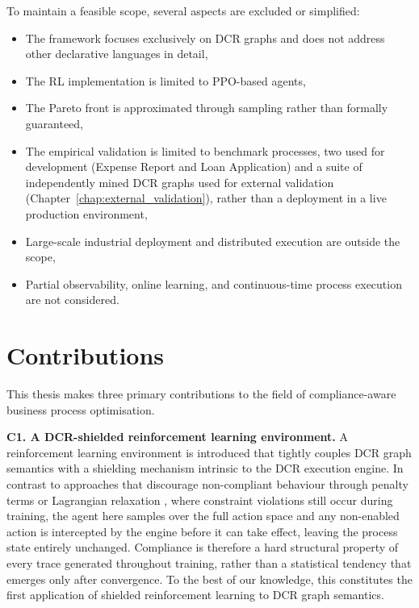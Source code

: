 To maintain a feasible scope, several aspects are excluded or
simplified:
\begin{itemize}
    \item The framework focuses exclusively on \ac{DCR} graphs and does
    not address other declarative languages in detail,
    \item The \ac{RL} implementation is limited to \ac{PPO}-based agents,
    \item The Pareto front is approximated through sampling rather than
    formally guaranteed,
    \item The empirical validation is limited to benchmark processes,
    two used for development (Expense Report and Loan Application) and a
    suite of independently mined \ac{DCR} graphs used for external
    validation (Chapter~\ref{chap:external_validation}), rather than a
    deployment in a live production environment,
    \item Large-scale industrial deployment and distributed execution are
    outside the scope,
    \item Partial observability, online learning, and
    continuous-time process execution are not considered.
\end{itemize}

\section{Contributions}
\label{sec:contributions}

This thesis makes three primary contributions to the field of
compliance-aware business process optimisation.

\textbf{C1.\label{cont:c1} A DCR-shielded reinforcement learning environment.}
A reinforcement learning environment is introduced that tightly couples
\ac{DCR} graph semantics with a shielding mechanism intrinsic to the
\ac{DCR} execution engine.
In contrast to approaches that discourage non-compliant behaviour
through penalty terms or Lagrangian relaxation
\cite{AltmanCONSTRAINEDPROCESSES, Achiam2017ConstrainedOptimization}, where
constraint violations still occur during training, the agent here
samples over the full action space and any non-enabled action is
intercepted by the engine before it can take effect, leaving the
process state entirely unchanged.
Compliance is therefore a hard structural property of every trace
generated throughout training, rather than a statistical tendency that
emerges only after convergence.
To the best of our knowledge, this constitutes the first application of
shielded reinforcement learning \cite{Alshiekh2017SafeShielding} to \ac{DCR} graph
semantics.

